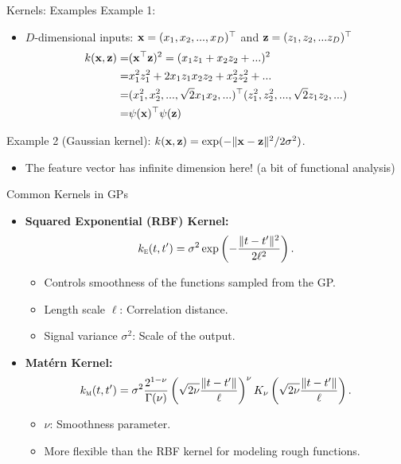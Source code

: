 \documentclass[11pt,handout,aspectratio=169]{beamer}
\begin{document}
\begin{frame}{Kernels: Examples}
Example 1:  \\[-.1cm]
\begin{itemize}
  \item $D$-dimensional inputs: $\mathbf{x}=(x_1,x_2,...,x_D)^\top$ and $\mathbf{z} =(z_1,z_2,...z_D)^\top$
  \begin{align*}
  k(\mathbf{x},\mathbf{z}) =& (\mathbf{x}^\top\mathbf{z})^2 = (x_1z_1 + x_2z_2 + ...)^2\\
  =& x_1^2z_1^2 +2x_1 z_1x_2z_2  + x_2^2z_2^2 + ...\\
  =& (x_1^2, x_2^2,...,\sqrt{2}x_1x_2, ...)^\top(z_1^2, z_2^2,...,\sqrt{2}z_1z_2,...)\\
  =&\psi(\mathbf{x})^\top\psi(\mathbf{z})
  \end{align*}
\end{itemize}
\vspace{.3cm}
Example 2 (Gaussian kernel):
  $ k(\mathbf{x},\mathbf{z}) =\exp(- \|\mathbf{x}-\mathbf{z}\|^2/2\sigma^2)$.\\[.1cm]  
  \begin{itemize}
  	\item The feature vector has infinite dimension here! (a bit of functional analysis)
  \end{itemize}
\end{frame}




\begin{frame}{Common Kernels in GPs}
\begin{itemize}
    \item \textbf{Squared Exponential (RBF) Kernel:}
    \[
    k_{\textsc{e}}(t, t') = \sigma^2 \exp\left(-\frac{\|t - t'\|^2}{2\ell^2}\right).
    \]
    \begin{itemize}
        \item Controls smoothness of the functions sampled from the GP.
        \item Length scale \( \ell \): Correlation distance.
        \item Signal variance \( \sigma^2 \): Scale of the output.
    \end{itemize}
    \item \textbf{Mat\'{e}rn Kernel:}
    \[
    k_{\textsc{m}}(t, t') = \sigma^2 \frac{2^{1-\nu}}{\Gamma(\nu)} \left(\sqrt{2\nu} \frac{\|t - t'\|}{\ell}\right)^\nu K_\nu\left(\sqrt{2\nu} \frac{\|t - t'\|}{\ell}\right).
    \]
    \begin{itemize}
        \item \( \nu \): Smoothness parameter.
        \item More flexible than the RBF kernel for modeling rough functions.
    \end{itemize}
\end{itemize}
\end{frame}
\end{document}
